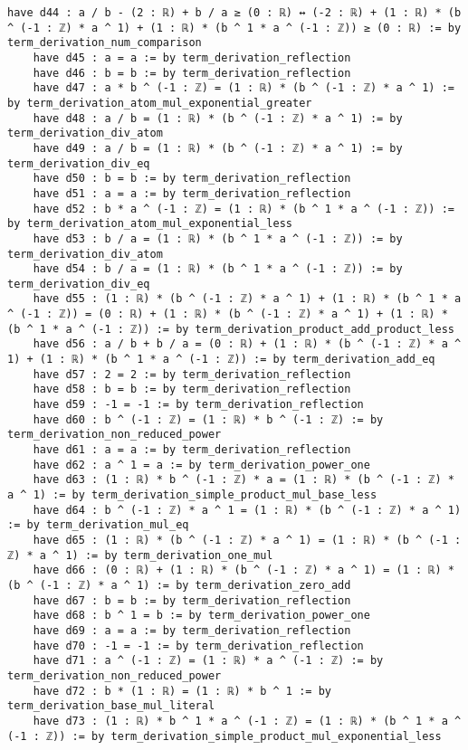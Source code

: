 \documentclass{article}
\begin{document}
\begin{tcolorbox}[colback=white!10, width=\linewidth]
\begin{lstlisting}[language=Lean4]
    have d44 : a / b - (2 : ℝ) + b / a ≥ (0 : ℝ) ↔ (-2 : ℝ) + (1 : ℝ) * (b ^ (-1 : ℤ) * a ^ 1) + (1 : ℝ) * (b ^ 1 * a ^ (-1 : ℤ)) ≥ (0 : ℝ) := by term_derivation_num_comparison
    have d45 : a = a := by term_derivation_reflection
    have d46 : b = b := by term_derivation_reflection
    have d47 : a * b ^ (-1 : ℤ) = (1 : ℝ) * (b ^ (-1 : ℤ) * a ^ 1) := by term_derivation_atom_mul_exponential_greater
    have d48 : a / b = (1 : ℝ) * (b ^ (-1 : ℤ) * a ^ 1) := by term_derivation_div_atom
    have d49 : a / b = (1 : ℝ) * (b ^ (-1 : ℤ) * a ^ 1) := by term_derivation_div_eq
    have d50 : b = b := by term_derivation_reflection
    have d51 : a = a := by term_derivation_reflection
    have d52 : b * a ^ (-1 : ℤ) = (1 : ℝ) * (b ^ 1 * a ^ (-1 : ℤ)) := by term_derivation_atom_mul_exponential_less
    have d53 : b / a = (1 : ℝ) * (b ^ 1 * a ^ (-1 : ℤ)) := by term_derivation_div_atom
    have d54 : b / a = (1 : ℝ) * (b ^ 1 * a ^ (-1 : ℤ)) := by term_derivation_div_eq
    have d55 : (1 : ℝ) * (b ^ (-1 : ℤ) * a ^ 1) + (1 : ℝ) * (b ^ 1 * a ^ (-1 : ℤ)) = (0 : ℝ) + (1 : ℝ) * (b ^ (-1 : ℤ) * a ^ 1) + (1 : ℝ) * (b ^ 1 * a ^ (-1 : ℤ)) := by term_derivation_product_add_product_less
    have d56 : a / b + b / a = (0 : ℝ) + (1 : ℝ) * (b ^ (-1 : ℤ) * a ^ 1) + (1 : ℝ) * (b ^ 1 * a ^ (-1 : ℤ)) := by term_derivation_add_eq
    have d57 : 2 = 2 := by term_derivation_reflection
    have d58 : b = b := by term_derivation_reflection
    have d59 : -1 = -1 := by term_derivation_reflection
    have d60 : b ^ (-1 : ℤ) = (1 : ℝ) * b ^ (-1 : ℤ) := by term_derivation_non_reduced_power
    have d61 : a = a := by term_derivation_reflection
    have d62 : a ^ 1 = a := by term_derivation_power_one
    have d63 : (1 : ℝ) * b ^ (-1 : ℤ) * a = (1 : ℝ) * (b ^ (-1 : ℤ) * a ^ 1) := by term_derivation_simple_product_mul_base_less
    have d64 : b ^ (-1 : ℤ) * a ^ 1 = (1 : ℝ) * (b ^ (-1 : ℤ) * a ^ 1) := by term_derivation_mul_eq
    have d65 : (1 : ℝ) * (b ^ (-1 : ℤ) * a ^ 1) = (1 : ℝ) * (b ^ (-1 : ℤ) * a ^ 1) := by term_derivation_one_mul
    have d66 : (0 : ℝ) + (1 : ℝ) * (b ^ (-1 : ℤ) * a ^ 1) = (1 : ℝ) * (b ^ (-1 : ℤ) * a ^ 1) := by term_derivation_zero_add
    have d67 : b = b := by term_derivation_reflection
    have d68 : b ^ 1 = b := by term_derivation_power_one
    have d69 : a = a := by term_derivation_reflection
    have d70 : -1 = -1 := by term_derivation_reflection
    have d71 : a ^ (-1 : ℤ) = (1 : ℝ) * a ^ (-1 : ℤ) := by term_derivation_non_reduced_power
    have d72 : b * (1 : ℝ) = (1 : ℝ) * b ^ 1 := by term_derivation_base_mul_literal
    have d73 : (1 : ℝ) * b ^ 1 * a ^ (-1 : ℤ) = (1 : ℝ) * (b ^ 1 * a ^ (-1 : ℤ)) := by term_derivation_simple_product_mul_exponential_less

\end{lstlisting}
\end{tcolorbox}
\end{document}
